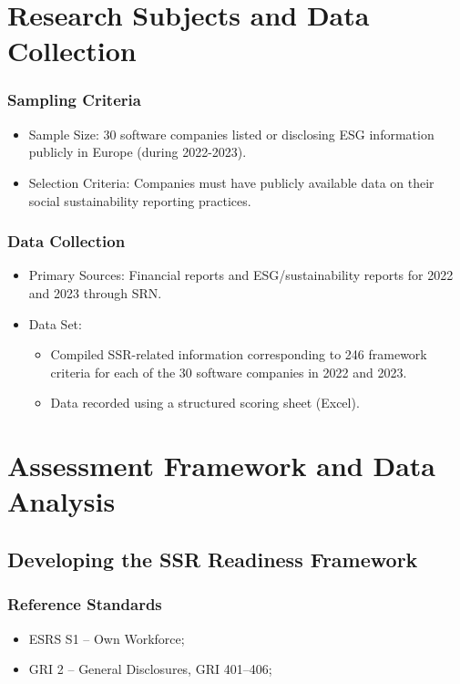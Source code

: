 \section{Research Subjects and Data Collection}
\subsubsection{Sampling Criteria}
\begin{itemize}
    \item Sample Size: 30 software companies listed or disclosing ESG information publicly in Europe (during 2022-2023).
    \item Selection Criteria: Companies must have publicly available data on their social sustainability reporting practices.
\end{itemize}

\subsubsection{Data Collection}
\begin{itemize}
    \item Primary Sources: Financial reports and ESG/sustainability reports for 2022 and 2023 through SRN.
    \item Data Set:
    \begin{itemize}
        \item Compiled SSR-related information corresponding to 246 framework criteria for each of the 30 software companies in 2022 and 2023.
        \item Data recorded using a structured scoring sheet (Excel).
    \end{itemize}
\end{itemize}

\section{Assessment Framework and Data Analysis}
\subsection{Developing the SSR Readiness Framework}
\subsubsection{Reference Standards}
\begin{itemize}
    \item ESRS S1 -- Own Workforce;
    \item GRI 2 -- General Disclosures, GRI 401--406;
\end{itemize}


